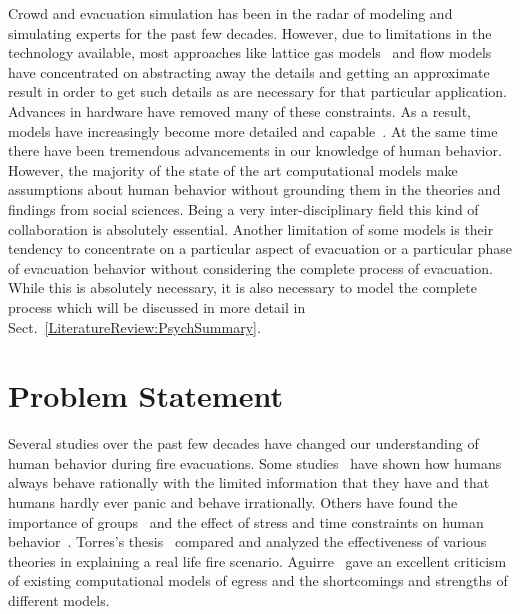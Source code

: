 Crowd and evacuation simulation has been in the radar of modeling and simulating experts for the past few decades. However, due to limitations in the technology available, most approaches like lattice gas models~\cite{Takima:2002wr} and flow models~\cite{Henderson:1974ve} have concentrated on abstracting away the details and getting an approximate result in order to get such details as are necessary for that particular application. Advances in hardware have removed many of these constraints. As a result, models have increasingly become more detailed and capable~\cite{Pan:2006vp}. At the same time there have been tremendous advancements in our knowledge of human behavior. However, the majority of the state of the art computational models make assumptions about human behavior without grounding them in the theories and findings from social sciences. Being a very inter-disciplinary field this kind of collaboration is absolutely essential. Another limitation of some models is their tendency to concentrate on a particular aspect of evacuation or a particular phase of evacuation behavior without considering the complete process of evacuation. While this is absolutely necessary, it is also necessary to model the complete process which will be discussed in more detail in Sect.~\ref{LiteratureReview:PsychSummary}. 

\section{Problem Statement}
\label{Intro:ProblemStatement}

Several studies over the past few decades have changed our understanding of human behavior during fire evacuations. Some studies~\cite{Kobes:2009jx,Schadschneider:2008cz,Reicher:2008ep,Torres:2010tj,Paulsen:1984ti,Sime:1983uy} have shown how humans always behave rationally with the limited information that they have and that humans hardly ever panic and behave irrationally. Others have found the importance of groups~\cite{Drury:2009ga} and the effect of stress and time constraints on human behavior~\cite{Ozel:2001tn}. Torres's thesis~\cite{Torres:2010tj} compared and analyzed the effectiveness of various theories in explaining a real life fire scenario. Aguirre~\cite{Aguirre:2004tn} gave an excellent criticism of existing computational models of egress and the shortcomings and strengths of different models. 

